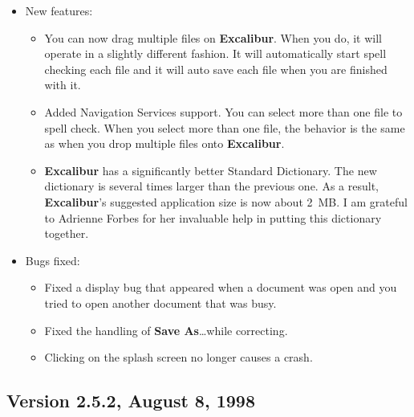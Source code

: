 ﻿\documentclass[11pt,titlepage]{article}
\newcommand{\ex}{\textbf{Excalibur}}
\begin{document}
\begin{itemize}
\item New features:

  \begin{itemize}
  \item You can now drag multiple files on \ex.  When you do, it will
    operate in a slightly different fashion.  It will automatically
    start spell checking each file and it will auto save each file
    when you are finished with it.

  \item Added Navigation Services support.  You can select more than
    one file to spell check.  When you select more than one file, the
    behavior is the same as when you drop multiple files onto \ex.

  \item \ex{} has a significantly better Standard Dictionary.  The new
    dictionary is several times larger than the previous one.  As a
    result, \ex's suggested application size is now about 2~MB.  I am
    grateful to Adrienne Forbes for her invaluable help in putting
    this dictionary together.

  \end{itemize}

\item Bugs fixed:

  \begin{itemize}
  \item Fixed a display bug that appeared when a document was open and
    you tried to open another document that was busy.

  \item Fixed the handling of \textbf{Save As}\ldots while correcting.

  \item Clicking on the splash screen no longer causes a crash.
  \end{itemize}

\end{itemize}

\subsection{Version 2.5.2, August 8, 1998}
\end{document}
